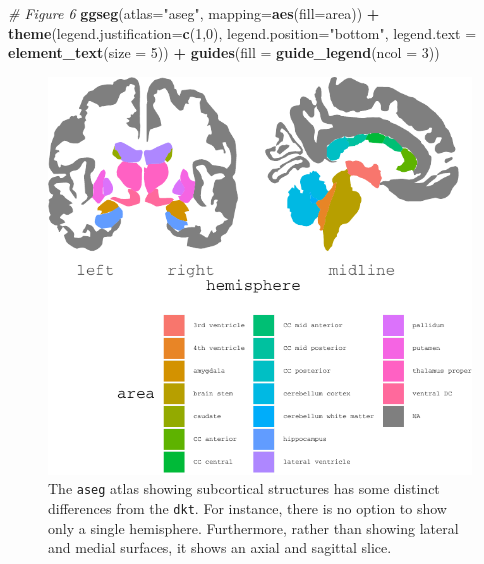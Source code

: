 \documentclass[fleqn,10pt]{wlpeerj} %
\newenvironment{Shaded}{\begin{snugshade}}{\end{snugshade}}
\newcommand{\CommentTok}[1]{\textcolor[rgb]{0.56,0.35,0.01}{\textit{#1}}}
\newcommand{\DataTypeTok}[1]{\textcolor[rgb]{0.13,0.29,0.53}{#1}}
\newcommand{\DecValTok}[1]{\textcolor[rgb]{0.00,0.00,0.81}{#1}}
\newcommand{\KeywordTok}[1]{\textcolor[rgb]{0.13,0.29,0.53}{\textbf{#1}}}
\newcommand{\NormalTok}[1]{#1}
\newcommand{\OperatorTok}[1]{\textcolor[rgb]{0.81,0.36,0.00}{\textbf{#1}}}
\newcommand{\StringTok}[1]{\textcolor[rgb]{0.31,0.60,0.02}{#1}}
\begin{document}
\begin{Shaded}
\begin{Highlighting}[]
\CommentTok{\# Figure 6}
\KeywordTok{ggseg}\NormalTok{(}\DataTypeTok{atlas=}\StringTok{"aseg"}\NormalTok{, }\DataTypeTok{mapping=}\KeywordTok{aes}\NormalTok{(}\DataTypeTok{fill=}\NormalTok{area)) }\OperatorTok{+}\StringTok{ }
\StringTok{  }\KeywordTok{theme}\NormalTok{(}\DataTypeTok{legend.justification=}\KeywordTok{c}\NormalTok{(}\DecValTok{1}\NormalTok{,}\DecValTok{0}\NormalTok{),}
        \DataTypeTok{legend.position=}\StringTok{"bottom"}\NormalTok{,}
        \DataTypeTok{legend.text =} \KeywordTok{element\_text}\NormalTok{(}\DataTypeTok{size =} \DecValTok{5}\NormalTok{)) }\OperatorTok{+}
\StringTok{  }\KeywordTok{guides}\NormalTok{(}\DataTypeTok{fill =} \KeywordTok{guide\_legend}\NormalTok{(}\DataTypeTok{ncol =} \DecValTok{3}\NormalTok{))}
\end{Highlighting}
\end{Shaded}

\begin{figure}
\centering
\includegraphics{msc_ggseg_files/figure-latex/atlases-1.pdf}
\caption{\label{fig:atlases}The \texttt{aseg} atlas showing subcortical structures has some distinct differences from the \texttt{dkt}. For instance, there is no option to show only a single hemisphere. Furthermore, rather than showing lateral and medial surfaces, it shows an axial and sagittal slice.}
\end{figure}
\end{document}
